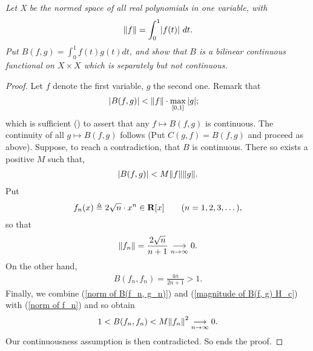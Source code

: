 \textit{%
Let X be the normed space of all real polynomials in one variable, with %
%
  \begin{align*}
    \norm{f}=\int_0^1\lvert f(t)\rvert\ dt.
\end{align*}
%
Put  %
  $B(f, g)=\int _0^1 f(t)g(t) dt $, %
%
and show that $B$ is a bilinear continuous functional on $X\times X$ %
which is separately but not continuous.
}
\begin{proof} Let $f$ denote the first variable, $g$ the second one. %
Remark that %
%
  \begin{align}\label{magnitude of B(f, g)}
    \abs{B(f, g)} 
      & < \norm{f} \cdot \max_{[0,1]} \abs{g} ; 
  \end{align}
%
which is sufficient () to assert that any %
%
  $f \mapsto B(f, g)$ 
%
is continuous. The continuity of all %
%
  $g \mapsto B(f,g)$ %
%
follows (Put $C(g, f) = B(f, g)$ and proceed as above). %
Suppose, to reach a contradiction, that $B$ is continuous. %
There so exists a positive $M$ such that, 
%
  \begin{align}\label{magnitude of B(f, g) H_c}
    \abs{B(f, g)} < M \norm{f}\norm{g}.
  \end{align}
%
Put %
%
  \begin{align}\label{definition of f_n}
    f_n(x)\triangleq 2 \sqrt{n}\cdot x^{n}\in {\mathbf R}[x] \quad\quad (n=1, 2, 3, \dots), 
  \end{align}
%
so that 
%
  \begin{align}\label{norm of f_n}
    \norm{f_n} = \frac{2 \sqrt{n}}{n+1} \underset{n\to \infty}{\longrightarrow}0.
  \end{align}
%
On the other hand,
%
  \begin{align}\label{norm of B(f_n, g_n)}
    B(f_n, f_n)= \frac{4 n}{2n+1} > 1.
  \end{align}
%
Finally, we combine %
%
  (\ref{norm of B(f_n, g_n)}) and %
  (\ref{magnitude of B(f, g) H_c}) with %
  (\ref{norm of f_n}) %
%
and so obtain
\begin{align}
 1 < B(f_n, f_n) <  M \norm{f_n}^2  \underset{n\to \infty}{\longrightarrow} 0.
\end{align}
Our continuousness assumption is then contradicted. So ends the proof.
\end{proof}
